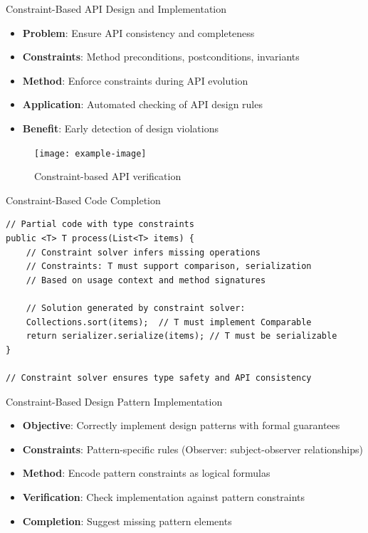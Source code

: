 \documentclass{beamer}
\begin{document}
\begin{frame}[t]{Constraint-Based API Design and Implementation}
\begin{itemize}
\item \textbf{Problem}: Ensure API consistency and completeness
\item \textbf{Constraints}: Method preconditions, postconditions, invariants
\item \textbf{Method}: Enforce constraints during API evolution
\item \textbf{Application}: Automated checking of API design rules
\item \textbf{Benefit}: Early detection of design violations
\end{itemize}
\begin{figure}
\texttt{[image: example-image]}
\caption{Constraint-based API verification}
\end{figure}
\end{frame}

\begin{frame}[fragile,t]{Constraint-Based Code Completion}
\begin{verbatim}
// Partial code with type constraints
public <T> T process(List<T> items) {
    // Constraint solver infers missing operations
    // Constraints: T must support comparison, serialization
    // Based on usage context and method signatures
    
    // Solution generated by constraint solver:
    Collections.sort(items);  // T must implement Comparable
    return serializer.serialize(items); // T must be serializable
}

// Constraint solver ensures type safety and API consistency
\end{verbatim}
\end{frame}

\begin{frame}[t]{Constraint-Based Design Pattern Implementation}
\begin{itemize}
\item \textbf{Objective}: Correctly implement design patterns with formal guarantees
\item \textbf{Constraints}: Pattern-specific rules (Observer: subject-observer relationships)
\item \textbf{Method}: Encode pattern constraints as logical formulas
\item \textbf{Verification}: Check implementation against pattern constraints
\item \textbf{Completion}: Suggest missing pattern elements
\end{itemize}
\end{frame}
\end{document}
